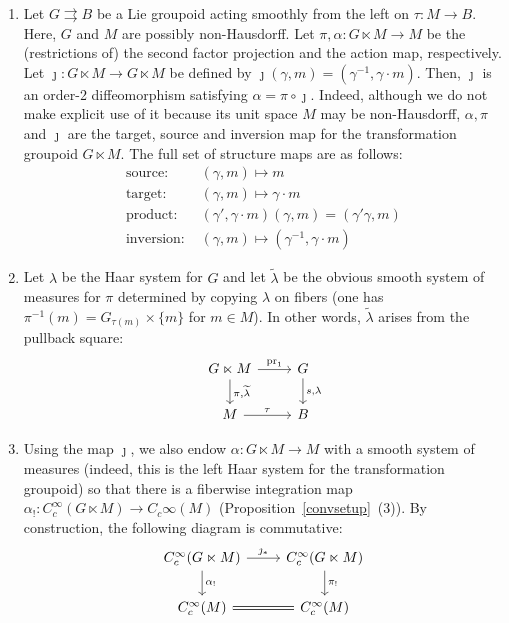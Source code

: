 \documentclass[12pt]{article}
\theoremstyle{plain}
\theoremstyle{definition}
\numberwithin{equation}{section}
\begin{document}
\begin{enumerate}
\item Let $G\rightrightarrows B$ be a Lie groupoid acting smoothly from the left on  $\tau:M\to B$. Here, $G$ and $M$ are possibly non-Hausdorff. Let $\pi ,\alpha : G \ltimes M \to M$ be the (restrictions of)   the second factor projection and the action map, respectively. Let $\jmath : G \ltimes M \to G \ltimes M$ be defined by $\jmath(\gamma,m)=(\gamma^{-1},\gamma \cdot m)$. Then, $\jmath$ is an order-2 diffeomorphism satisfying $\alpha=\pi\circ\jmath$. Indeed, although we do not make explicit use of it because its unit space $M$ may be non-Hausdorff, $\alpha, \pi$ and $\jmath$ are the target, source and inversion map for the transformation groupoid  $G \ltimes M$. The full set of structure maps are as follows:
\begin{align*}
\text{source: } &(\gamma,m) \mapsto m  \\
\text{target: } &(\gamma,m) \mapsto \gamma\cdot m \\
\text{product: } &(\gamma',\gamma\cdot m) (\gamma,m) = (\gamma'\gamma,m)\\
\text{inversion: } &(\gamma,m)   \mapsto (\gamma^{-1},\gamma\cdot m)
\end{align*}

\item Let $\lambda$ be the Haar system for $G$ and let $\widetilde \lambda$ be the obvious smooth system of measures for $\pi$ determined by copying $\lambda$ on fibers (one has  $\pi^{-1}(m)=G_{\tau(m)} \times \{m\}$ for $m \in M$). In other words, $\widetilde \lambda$ arises from the pullback square:
\[ \begin{tikzcd}
G \ltimes M \ar[r,"{\mathrm{pr}_1}"] \ar[d,"{\pi,\widetilde \lambda}"] & G \ar[d,"{s, \lambda}"] \\
M \ar[r,"\tau"] & B
\end{tikzcd} \]

\item Using the map $\jmath$, we also endow $\alpha : G\ltimes M\to M$ with a smooth system of measures (indeed, this is the left Haar system for the transformation groupoid) so that there is a fiberwise integration map $\alpha_! : C_c^\infty(G\ltimes M) \to C_c\infty(M)$ (Proposition~\ref{convsetup}~(3)). By construction, the following diagram is commutative:
\[ \begin{tikzcd}
C_c^\infty(G \ltimes M)   \ar[r,"{\jmath_*}"] \ar[d,"{\alpha_!}"] & C_c^\infty(G \ltimes M) \ar[d,"\pi_!"] \\
C_c^\infty(M) \ar[r,equals] & C_c^\infty(M) 
\end{tikzcd} \]


\end{enumerate}
\end{document}
